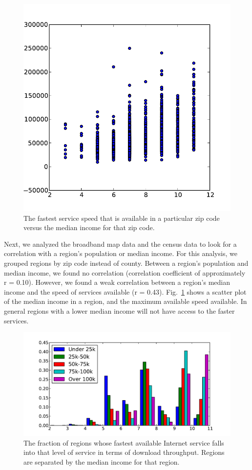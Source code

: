 \documentclass{sig-alternate-10pt}
\begin{document}
\begin{figure}
\centering
        \includegraphics[width=0.9\linewidth]{figs/maxIncome_maxDown.pdf}
  \caption{The fastest service speed that is available 
in a particular zip code versus the median income for that
zip code.}
  \label{fig:services-incomeVsDown}
\end{figure}

Next, we analyzed the broadband map data and the census data to look for a
correlation with a region's population or median income.  For this analysis,
we grouped regions by zip code instead of county. Between a region's population
and median income, we found no correlation (correlation coefficient of 
approximately r = 0.10).  However, we found a weak correlation between 
a region's median income and the speed of services available (r = 0.43). 
Fig.~\ref{fig:services-incomeVsDown} shows a scatter plot of the median
income in a region, and the maximum available speed available. In general
regions with a lower median income will not have access to the faster 
services.

\begin{figure}
\centering
        \includegraphics[width=0.9\linewidth]{figs/all_hist.pdf}
  \caption{The fraction of regions whose fastest available Internet
service falls into that level of service in terms of download throughput.
Regions are separated by the median income for that region.}
  \label{fig:services-hist}
\end{figure}
\end{document}
